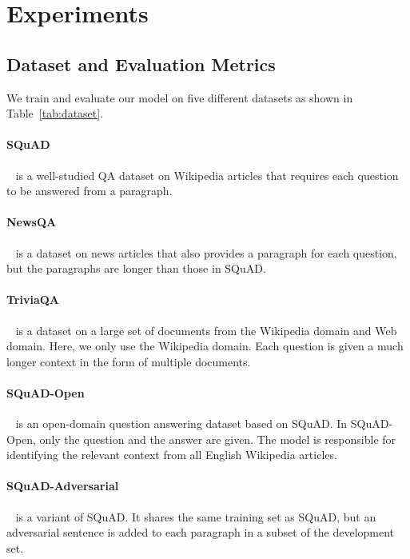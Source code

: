 \documentclass[11pt,a4paper]{article}
\begin{document}
 \section{Experiments}\label{sec:exp}\subsection{Dataset and Evaluation Metrics}\label{sec:exp-dataset}
We train and evaluate our model on five different datasets as shown in Table~\ref{tab:dataset}.\\

\vspace{-.2cm}
\paragraph{SQuAD}~\cite{squad} is a well-studied QA dataset on Wikipedia articles that requires each question to be answered from a paragraph.

\vspace{-.2cm}
\paragraph{NewsQA}~\cite{newsqa} is a dataset on news articles that also provides a paragraph for each question, but the paragraphs are longer than those in SQuAD.

\vspace{-.2cm}
\paragraph{TriviaQA}~\cite{triviaqa} is a dataset on a large set of documents from the Wikipedia domain and Web domain. Here, we only use the Wikipedia domain.
Each question is given a much longer context in the form of multiple documents.

\vspace{-.2cm}
\paragraph{SQuAD-Open}~\cite{squad-open} is an open-domain question answering dataset based on SQuAD. In SQuAD-Open, only the question and the answer are given. The model is responsible for identifying the relevant context from all English Wikipedia articles.

\vspace{-.2cm}
\paragraph{SQuAD-Adversarial}~\cite{squad-adversarial} is a variant of SQuAD. It shares the same training set as SQuAD, but an adversarial sentence is added to each paragraph in a subset of the development set. \\
\end{document}
